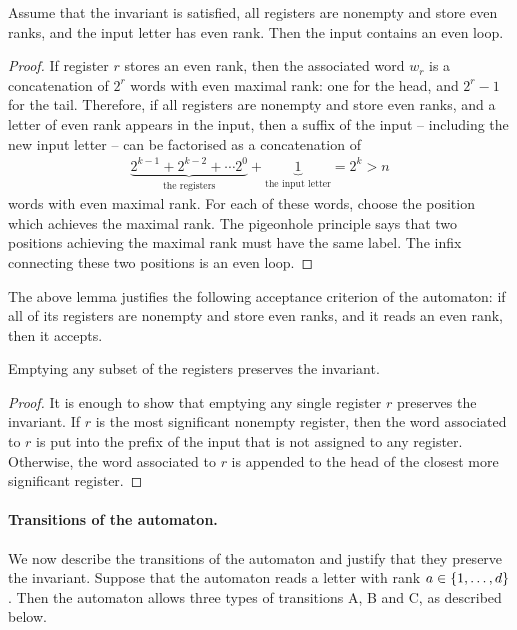\begin{lemma}\label{lem:quasi-accept}
Assume that the invariant is satisfied, all registers are nonempty and store even ranks, and the input letter has  even rank.  Then  the input contains an even loop.
\end{lemma}
\begin{proof} If register $r$ stores an even rank,  then the associated word $w_r$ is a concatenation of $2^r$ words with even maximal rank: one for the head, and  $2^r-1$ for the tail. Therefore, if all registers are nonempty and store even ranks, and a letter of even rank appears in the input,  then a  suffix of the input -- including the new input letter -- can be factorised as a concatenation of
\begin{align*}
  \underbrace{2^{k -1} + 2^{k -2} + \cdots 2^{0}}_{\text{the registers}} + \underbrace {1}_{\text{the input letter}} = 2^{k} > n
\end{align*}
words with even maximal rank. For each of these words, choose the position which achieves the maximal rank. The pigeonhole principle says that two positions achieving the maximal rank  must have the same label. The infix connecting these two positions is an even loop.
\end{proof}

The above lemma justifies the following acceptance criterion of the automaton: if all of its registers are nonempty and store even ranks, and it reads an even rank, then it accepts. 

\begin{lemma}\label{lem:quasy-empty-registers}
Emptying any subset of the registers preserves the invariant.
\end{lemma}
\begin{proof}
It is enough to show that emptying any single  register $r$ preserves the invariant. If $r$ is the most significant nonempty register, then the word associated to $r$ is put into the prefix of the input that is not assigned to any register. Otherwise, the word associated to $r$ is appended to the head of the closest more significant register.
\end{proof}


\paragraph*{Transitions of the automaton.} We now describe the transitions of the automaton and justify that they preserve the invariant. Suppose that the automaton reads a letter with rank  $a \in \{1,\ldots,d\}$. Then the automaton allows three types of transitions A, B and C, as described below.


